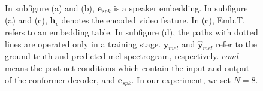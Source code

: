 \documentclass[letterpaper]{article} %
\begin{document}
\begin{figure}
\centering
{}
\caption{In subfigure (a) and (b), $\boldsymbol{e}_{spk}$ is a speaker embedding. In subfigure (a) and (c), $\boldsymbol{h}_v$ denotes the encoded video feature. In (c), Emb.T. refers to an embedding table. In subfigure (d), the paths with dotted lines are operated only in a training stage. $\boldsymbol{y}_{mel}$ and $\hat{\boldsymbol{y}}_{mel}$ refer to the ground truth and predicted mel-spectrogram, respectively. $cond$ means the post-net conditions which contain the input and output of the conformer decoder, and $\boldsymbol{e}_{spk}$. In our experiment, we set $N=8$.}
\label{fig:architecture}
\end{figure}
\end{document}
